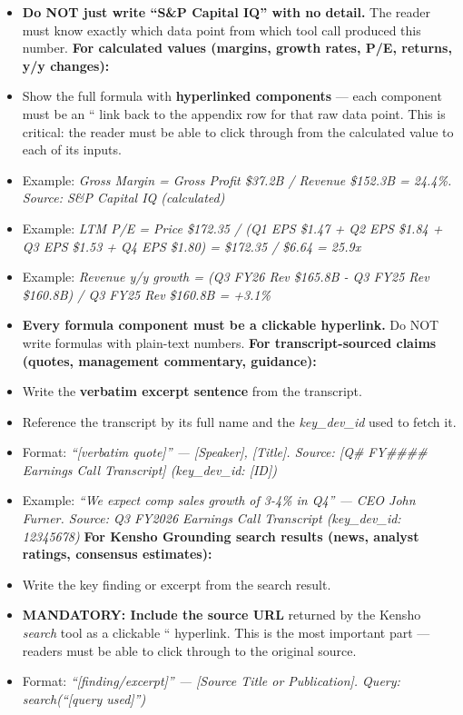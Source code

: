 \documentclass[11pt]{article}
\begin{document}
\begin{itemize}[leftmargin=*,itemsep=2pt,topsep=2pt]
\begin{itemize}[leftmargin=*,itemsep=2pt,topsep=2pt]
\begin{itemize}[leftmargin=*,itemsep=2pt,topsep=2pt]
\end{itemize}
\item {} \textbf{Do NOT just write ``S\&P Capital IQ'' with no detail.} The reader must know exactly which data point from which tool call produced this number. \textbf{For calculated values (margins, growth rates, P/E, returns, y/y changes):}
\item {} Show the full formula with \textbf{hyperlinked components} — each component must be an `` link back to the appendix row for that raw data point. This is critical: the reader must be able to click through from the calculated value to each of its inputs.
\item {} Example: \emph{Gross Margin = Gross Profit \$37.2B / Revenue \$152.3B = 24.4\%. Source: S\&P Capital IQ (calculated)}
\item {} Example: \emph{LTM P/E = Price \$172.35 / (Q1 EPS \$1.47 + Q2 EPS \$1.84 + Q3 EPS \$1.53 + Q4 EPS \$1.80) = \$172.35 / \$6.64 = 25.9x}
\item {} Example: \emph{Revenue y/y growth = (Q3 FY26 Rev \$165.8B - Q3 FY25 Rev \$160.8B) / Q3 FY25 Rev \$160.8B = +3.1\%}
\item {} \textbf{Every formula component must be a clickable hyperlink.} Do NOT write formulas with plain-text numbers. \textbf{For transcript-sourced claims (quotes, management commentary, guidance):}
\item {} Write the \textbf{verbatim excerpt sentence} from the transcript.
\item {} Reference the transcript by its full name and the \emph{key\_\allowbreak{}dev\_\allowbreak{}id} used to fetch it.
\item {} Format: \emph{``[verbatim quote]'' — [Speaker], [Title]. Source: [Q\# FY\#\#\#\# Earnings Call Transcript] (key\_\allowbreak{}dev\_\allowbreak{}id: [ID])}
\item {} Example: \emph{``We expect comp sales growth of 3-4\% in Q4'' — CEO John Furner. Source: Q3 FY2026 Earnings Call Transcript (key\_\allowbreak{}dev\_\allowbreak{}id: 12345678)} \textbf{For Kensho Grounding search results (news, analyst ratings, consensus estimates):}
\item {} Write the key finding or excerpt from the search result.
\item {} \textbf{MANDATORY: Include the source URL} returned by the Kensho \emph{search} tool as a clickable `` hyperlink. This is the most important part — readers must be able to click through to the original source.
\item {} Format: \emph{``[finding/excerpt]'' — [Source Title or Publication]. Query: search(``[query used]'')}

\end{itemize}
\end{itemize}
\end{document}
